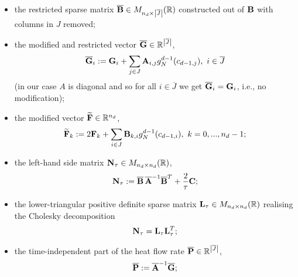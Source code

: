 \begin{algorithm}
\begin{enumerate}
\begin{itemize}
          the restricted diagonal matrix
          $\overline{\bf A} \in
            M_{\abs{\overline{J}} \times \abs{\overline{J}}}(\R)$
          constructed out of ${\bf A}$ with rows and columns in $J$ removed;
        \item
          the restricted sparse matrix
          $\overline{\bf B} \in M_{n_d \times \left\lvert\overline{J}\right\rvert}(\mathbb{R})$
          constructed out of ${\bf B}$ with columns in $J$ removed;
        \item
          the modified and restricted vector
          $\overline{\bf G} \in \mathbb{R}^{\left\lvert\overline{J}\right\rvert}$,
          \begin{equation}
            \overline{\bf G}_i :=
            {\bf G}_i
            + \sum_{j \in J} {\bf A}_{i, j} g_N^{d - 1}(c_{d - 1, j}),\
            i \in \overline{J}
          \end{equation}
          (in our case  $A$ is diagonal and so for all $i \in \overline{J}$
          we get $\overline{\bf G}_i = {\bf G}_i$, i.e., no modification);
        \item
          the modified vector $\widetilde{\bf F} \in \mathbb{R}^{n_d}$,
          \begin{equation}
            \widetilde{\bf F}_k
            := 2 {\bf F}_k
              + \sum_{i \in J} {\bf B}_{k, i} g_N^{d - 1}(c_{d - 1, i}),\
            k = 0, ..., n_d - 1;
          \end{equation}
        \item
          the left-hand side matrix ${\bf N}_\tau \in M_{n_d \times n_d}(\mathbb{R})$,
          \begin{equation}
            {\bf N}_\tau
            := \overline{\bf B}\, \overline{\bf A}^{-1} \overline{\bf B}^T
              + \frac{2}{\tau} {\bf C};
          \end{equation}
        \item
          the lower-triangular positive definite sparse matrix
          ${\bf L}_\tau \in M_{n_d \times n_d}(\mathbb{R})$
          realising the Cholesky decomposition
          \begin{equation}
            {\bf N}_\tau = {\bf L}_\tau {\bf L}^T_\tau;
          \end{equation}
        \item
          the time-independent part of the heat flow rate
          $\overline{\bf P} \in \mathbb{R}^{\left\lvert\overline{J}\right\rvert}$,
          \begin{equation}
            \overline{\bf P} := \overline{\bf A}^{-1} \overline{\bf G};
          \end{equation}

\end{itemize}
\end{enumerate}
\end{algorithm}
